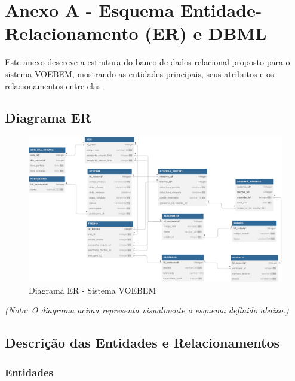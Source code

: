 \chapter*{Anexo A - Esquema Entidade-Relacionamento (ER) e DBML}
\label{anexo:er-dbml}

Este anexo descreve a estrutura do banco de dados relacional proposto para o sistema VOEBEM, mostrando as entidades principais, seus atributos e os relacionamentos entre elas.

\section*{Diagrama ER}

\begin{figure}[htbp]
    \centering
    \includegraphics[width=1.4\textwidth, angle=90]{../assets/er-diagram-voebem.pdf}
    \caption{Diagrama ER - Sistema VOEBEM}
    \label{fig:diagrama-er}
\end{figure}

\textit{(Nota: O diagrama acima representa visualmente o esquema definido abaixo.)}

\section*{Descrição das Entidades e Relacionamentos}

\subsection*{Entidades}

